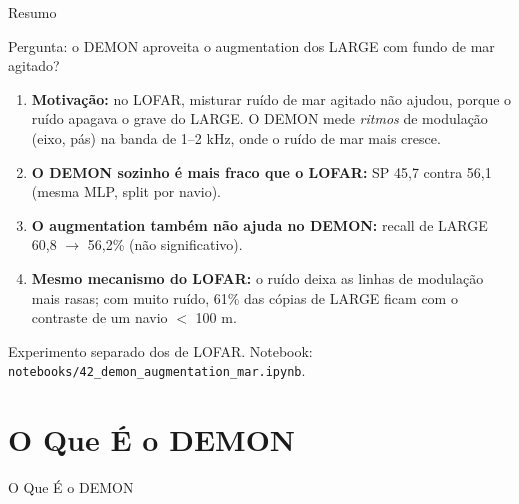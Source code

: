\documentclass[aspectratio=169]{beamer}
\begin{document}
\begin{frame}{Resumo}
    \footnotesize
    \begin{block}{\small Pergunta: o DEMON aproveita o augmentation dos LARGE com fundo de mar agitado?}
        \scriptsize
        \begin{enumerate}
            \setlength{\itemsep}{3pt}
            \item \textbf{Motivação:} no LOFAR, misturar ruído de mar agitado não ajudou, porque o ruído apagava o grave do LARGE. O DEMON mede \emph{ritmos} de modulação (eixo, pás) na banda de 1--2 kHz, onde o ruído de mar mais cresce.
            \item \textbf{O DEMON sozinho é mais fraco que o LOFAR:} SP 45,7 contra 56,1 (mesma MLP, split por navio).
            \item \textbf{O augmentation também não ajuda no DEMON:} recall de LARGE 60,8 $\rightarrow$ 56,2\% (não significativo).
            \item \textbf{Mesmo mecanismo do LOFAR:} o ruído deixa as linhas de modulação mais rasas; com muito ruído, 61\% das cópias de LARGE ficam com o contraste de um navio $<$ 100 m.
        \end{enumerate}
    \end{block}
    \vspace{0.1cm}
    {\tiny Experimento separado dos de LOFAR. Notebook: \texttt{notebooks/42\_demon\_augmentation\_mar.ipynb}.\par}
\end{frame}

\section{O Que É o DEMON}

\begin{frame}
    \centering
    \huge O Que É o DEMON
\end{frame}
\end{document}
